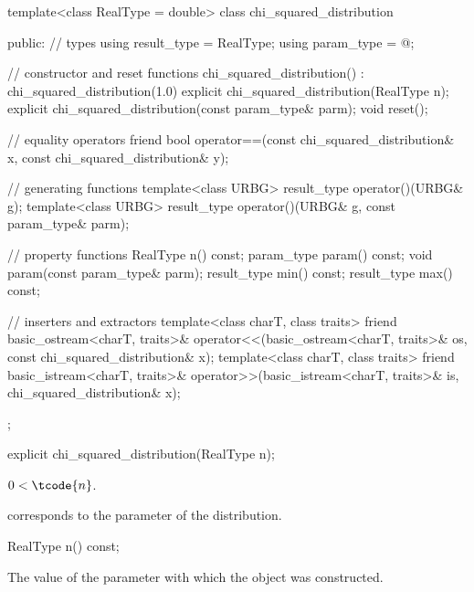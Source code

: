 %
%
\begin{codeblock}
template<class RealType = double>
  class chi_squared_distribution {
  public:
    // types
    using result_type = RealType;
    using param_type  = @\unspec@;

    // constructor and reset functions
    chi_squared_distribution() : chi_squared_distribution(1.0) {}
    explicit chi_squared_distribution(RealType n);
    explicit chi_squared_distribution(const param_type& parm);
    void reset();

    // equality operators
    friend bool operator==(const chi_squared_distribution& x, const chi_squared_distribution& y);

    // generating functions
    template<class URBG>
      result_type operator()(URBG& g);
    template<class URBG>
      result_type operator()(URBG& g, const param_type& parm);

    // property functions
    RealType n() const;
    param_type param() const;
    void param(const param_type& parm);
    result_type min() const;
    result_type max() const;

    // inserters and extractors
    template<class charT, class traits>
      friend basic_ostream<charT, traits>&
        operator<<(basic_ostream<charT, traits>& os, const chi_squared_distribution& x);
    template<class charT, class traits>
      friend basic_istream<charT, traits>&
        operator>>(basic_istream<charT, traits>& is, chi_squared_distribution& x);
  };
\end{codeblock}

%
\begin{itemdecl}
explicit chi_squared_distribution(RealType n);
\end{itemdecl}

\begin{itemdescr}
\pnum
\expects
$0 < \tcode{n}$.

\pnum
\remarks
{} corresponds to the parameter of the distribution.
\end{itemdescr}

%
\begin{itemdecl}
RealType n() const;
\end{itemdecl}

\begin{itemdescr}
\pnum
\returns
The value of the  parameter
 with which the object was constructed.
\end{itemdescr}

